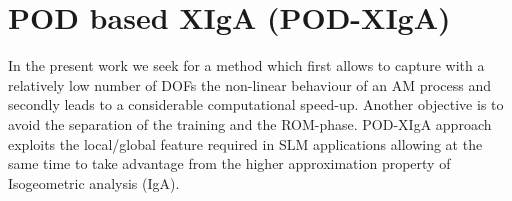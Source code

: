 \documentclass[3p]{article}
\begin{document}

\section*{POD based XIgA (POD-XIgA)}

In the present work we seek for a method which first allows to capture with a relatively low number of DOFs the non-linear behaviour of an AM process and secondly leads to a considerable computational speed-up. Another objective is to avoid the separation of the training and the ROM-phase. POD-XIgA approach exploits the local/global feature required in SLM applications allowing at the same time to take advantage from the higher approximation property of Isogeometric analysis (IgA).

\end{document}

